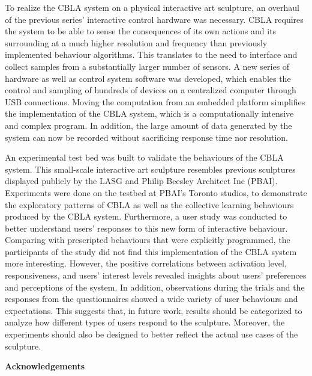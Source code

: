 To realize the CBLA system on a physical interactive art sculpture, an overhaul of the previous series' interactive control hardware was necessary. CBLA requires the system to be able to sense the consequences of its own actions and its surrounding at a much higher resolution and frequency than previously implemented behaviour algorithms. This translates to the need to interface and collect samples from a substantially larger number of sensors. A new series of hardware as well as control system software was developed, which enables the control and sampling of hundreds of devices on a centralized computer through USB connections. Moving the computation from an embedded platform simplifies the implementation of the CBLA system, which is a computationally intensive and complex program. In addition, the large amount of data generated by the system can now be recorded without sacrificing response time nor resolution.  

An experimental test bed was built to validate the behaviours of the CBLA system. This small-scale interactive art sculpture resembles previous sculptures displayed publicly by the LASG and Philip Beesley Architect Inc (PBAI). Experiments were done on the testbed at PBAI's Toronto studios, to demonstrate the exploratory patterns of CBLA as well as the collective learning behaviours produced by the CBLA system. Furthermore, a user study was conducted to better understand users' responses to this new form of interactive behaviour. Comparing with prescripted behaviours that were explicitly programmed, the participants of the study did not find this implementation of the CBLA system more interesting. However, the positive correlations between activation level, responsiveness, and users' interest levels revealed insights about users' preferences and perceptions of the system. In addition, observations during the trials and the responses from the questionnaires showed a wide variety of user behaviours and expectations. This suggests that, in future work, results should be categorized to analyze how different types of users respond to the sculpture. Moreover, the experiments should also be designed to better reflect the actual use cases of the sculpture. 



\cleardoublepage


\begin{center}\textbf{Acknowledgements}\end{center}


